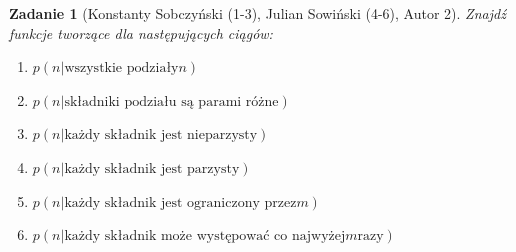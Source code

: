 \documentclass{mwart}
\newtheorem{zad}{Zadanie}[section]
\begin{document}
\begin{zad}[Konstanty Sobczyński (1-3), Julian Sowiński (4-6), Autor 2]
    Znajdź funkcje tworzące dla następujących ciągów:
    \begin{enumerate}
        \item $p(n | \text{wszystkie podziały} n)$
        \item $p(n | \text{składniki podziału są parami różne})$
        \item $p(n | \text{każdy składnik jest nieparzysty})$
        \item $p(n | \text{każdy składnik jest parzysty})$
        \item $p(n | \text{każdy składnik jest ograniczony przez} m )$
        \item $p(n | \text{każdy składnik może występować co najwyżej} m \text{razy})$
    \end{enumerate}
\end{zad}
\end{document}
